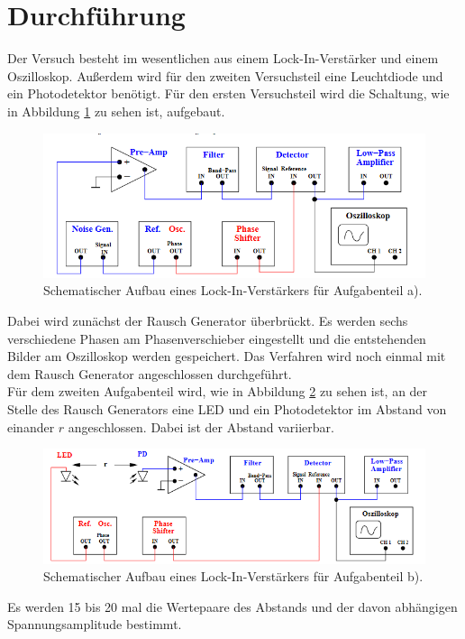 \section{Durchführung}
\label{sec:Durchführung}
Der Versuch besteht im wesentlichen aus einem Lock-In-Verstärker und einem Oszilloskop. Außerdem wird für den zweiten Versuchsteil eine Leuchtdiode und ein Photodetektor benötigt.
Für den ersten Versuchsteil wird die Schaltung, wie in Abbildung \ref{fig:aufa} zu sehen ist, aufgebaut.
\begin{figure}
    \centering
    \caption{Schematischer Aufbau eines Lock-In-Verstärkers für Aufgabenteil a).\cite{v303}}
    \label{fig:aufa}
    \includegraphics[width = 0.6 \textwidth]{Pics/aufa.png}
\end{figure}
Dabei wird zunächst der Rausch Generator überbrückt. Es werden sechs verschiedene Phasen am Phasenverschieber eingestellt und die entstehenden
Bilder am Oszilloskop werden gespeichert. Das Verfahren wird noch einmal mit dem Rausch Generator angeschlossen durchgeführt.
\\
Für dem zweiten Aufgabenteil wird, wie in Abbildung \ref{fig:aufb} zu sehen ist, an der Stelle des Rausch Generators eine LED und ein Photodetektor im Abstand von einander $r$ angeschlossen.
Dabei ist der Abstand variierbar. 
\begin{figure}
    \centering
    \caption{Schematischer Aufbau eines Lock-In-Verstärkers für Aufgabenteil b).\cite{v303}}
    \label{fig:aufb}
    \includegraphics[width = 0.6 \textwidth]{Pics/aufb.png}
\end{figure}
Es werden 15 bis 20 mal die Wertepaare des Abstands und der davon abhängigen Spannungsamplitude bestimmt.